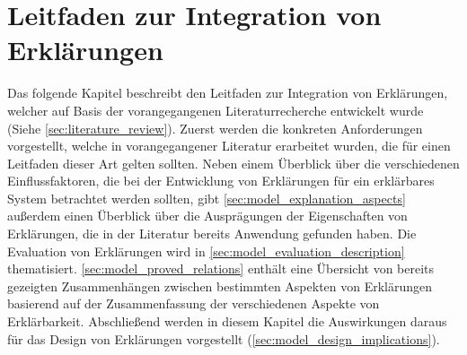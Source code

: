 \chapter{Leitfaden zur Integration von Erklärungen}

Das folgende Kapitel beschreibt den Leitfaden zur Integration von Erklärungen, welcher auf Basis der vorangegangenen Literaturrecherche entwickelt wurde (Siehe \autoref{sec:literature_review}). Zuerst werden die konkreten Anforderungen vorgestellt, welche in vorangegangener Literatur erarbeitet wurden, die für einen Leitfaden dieser Art gelten sollten. Neben einem Überblick über die verschiedenen Einflussfaktoren, die bei der Entwicklung von Erklärungen für ein erklärbares System betrachtet werden sollten, gibt \autoref{sec:model_explanation_aspects} außerdem einen Überblick über die Ausprägungen der Eigenschaften von Erklärungen, die in der Literatur bereits Anwendung gefunden haben. Die Evaluation von Erklärungen wird in \autoref{sec:model_evaluation_description} thematisiert. \autoref{sec:model_proved_relations} enthält eine Übersicht von bereits gezeigten Zusammenhängen zwischen bestimmten Aspekten von Erklärungen basierend auf der Zusammenfassung der verschiedenen Aspekte von Erklärbarkeit. Abschließend werden in diesem Kapitel die Auswirkungen daraus für das Design von Erklärungen vorgestellt (\autoref{sec:model_design_implications}).

% 





\newpage

